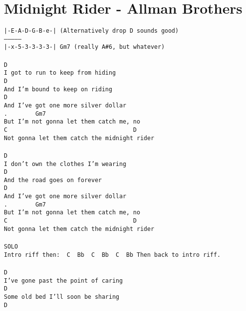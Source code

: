 \newpage
\section{Midnight Rider - Allman Brothers}
\label{Midnight Rider - Allman Brothers}
\texttt{|-E-A-D-G-B-e-| (Alternatively drop D sounds good)\\
---------------\\
|-x-5-3-3-3-3-|\ Gm7 (really A\#6, but whatever)\\
\\
D\\
I\ got\ to\ run\ to\ keep\ from\ hiding\\
D\\
And\ I'm\ bound\ to\ keep\ on\ riding\\
D\\
And\ I've\ got\ one\ more\ silver\ dollar\\
. \ \ \ \ \ \ \ Gm7\\
But\ I'm\ not\ gonna\ let\ them\ catch\ me,\ no\\
C\ \ \ \ \ \ \ \ \ \ \ \ \ \ \ \ \ \ \ \ \ \ \ \ \ \ \ \ \ \ \ \ \ \ \ \ D\\
Not\ gonna\ let\ them\ catch\ the\ midnight\ rider\\
\\
D\\
I\ don't\ own\ the\ clothes\ I'm\ wearing\\
D\\
And\ the\ road\ goes\ on\ forever\\
D\\
And\ I've\ got\ one\ more\ silver\ dollar\\
. \ \ \ \ \ \ \ Gm7\\
But\ I'm\ not\ gonna\ let\ them\ catch\ me,\ no\\
C\ \ \ \ \ \ \ \ \ \ \ \ \ \ \ \ \ \ \ \ \ \ \ \ \ \ \ \ \ \ \ \ \ \ \ \ D\\
Not\ gonna\ let\ them\ catch\ the\ midnight\ rider\\
\\
SOLO\\
Intro\ riff\ then:\ \ C\ \ Bb\ \ C\ \ Bb\ \ C\ \ Bb\ Then\ back\ to\ intro\ riff.\\
\\
D\\
I've\ gone\ past\ the\ point\ of\ caring\\
D\\
Some\ old\ bed\ I'll\ soon\ be\ sharing\\
D\\
}
